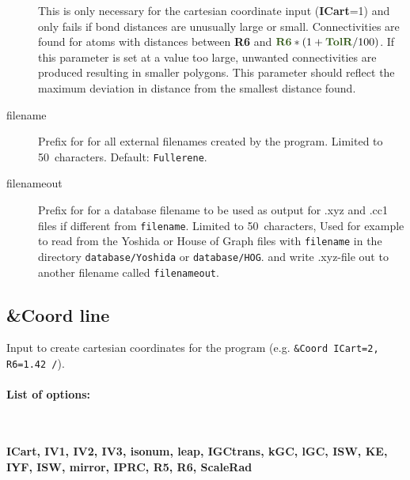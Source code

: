 \documentclass[article,a4paper,twoside]{memoir}
\newcommand{\filename}[1]{\texttt{#1}}
\newcommand{\paramname}[1]{{\color{green}\textbf{#1}}}
\begin{document}
\begin{description}
  This is only necessary for the cartesian coordinate input (\paramname{ICart}=1) and only fails if bond distances are unusually large or small. 
  Connectivities are found for atoms with distances between \paramname{R6} and $\paramname{R6}*(1+\paramname{TolR}/100)$. 
  If this parameter is set at a value too large, unwanted connectivities are produced resulting in smaller polygons. 
  This parameter should reflect the maximum deviation in distance from the smallest distance found.
\item[{filename}] 
    Prefix for for all external filenames created by the program. Limited to 50~characters. Default: \filename{Fullerene}.
\item[{filenameout}] 
    Prefix for for a database filename to be used as output for .xyz and .cc1 files if different from \filename{filename}. Limited to 50~characters, 
    Used for example to read from the Yoshida or House of Graph files with \filename{filename} in the directory \filename{database/Yoshida} or \filename{database/HOG}.
    and write .xyz-file out to another filename called \filename{filenameout}.
\end{description}


\subsection{\&Coord line}

Input to create cartesian coordinates for the program (e.g. \verb|&Coord ICart=2, R6=1.42 /|).
\paragraph{List of options:}\ 

\paramname{ICart, IV1, IV2, IV3, isonum, leap, IGCtrans, kGC, lGC, ISW, KE, IYF, ISW, mirror, IPRC, R5, R6, ScaleRad}
\end{document}
